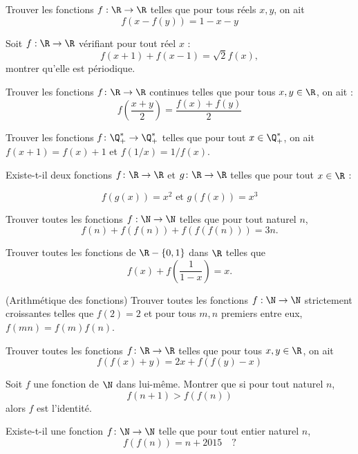 \begin{exo}
Trouver les fonctions $f:\R \rightarrow \R$ telles que pour tous réels $x,y$, on ait
$$f(x-f(y))=1-x-y$$
\end{exo}

\begin{exo}
Soit $f : \R \rightarrow \R$ vérifiant pour tout réel $x$ :
$$f(x+1)+f(x-1)= \sqrt{2}f(x),$$
montrer qu'elle est périodique. 
\end{exo}

\begin{exo}
Trouver les fonctions $f \colon \R \to \R$ continues telles que 
pour tous $x, y \in \R$, on ait :
\[f\left(\frac{x + y}{2}\right) = \frac{f(x) + f(y)}{2}\]
\end{exo}


\begin{exo}Trouver les fonctions $f \colon \Q_+^* \to \Q_+^*$ telles que pour tout $x \in  \Q_+^*$, on ait $f(x + 1) = f(x) + 1$ et $f(1/x) = 1/f(x)$.
\end{exo}



\begin{exo}Existe-t-il deux fonctions $f \colon \R \to \R$ et $g \colon \R \to \R$ telles que pour tout $x \in \R$ :

\[f(g(x)) = x^2 \text{ et } g(f(x)) = x^3\]
\end{exo}

\begin{exo}
Trouver toutes les fonctions $f : \N \rightarrow \N$ telles que pour tout naturel $n$,
$$f(n)+f(f(n))+f(f(f(n)))=3n.$$
\end{exo}

\begin{exo}
Trouver toutes les fonctions de $\R-\lbrace 0,1 \rbrace$ dans $\R$ telles que 
$$f(x)+f\left( \frac{1}{1-x}\right)=x.$$
\end{exo}


\begin{exo}(Arithmétique des fonctions)
Trouver toutes les fonctions $f : \N \rightarrow \N$ strictement croissantes telles que $f(2)=2$ et pour tous $m,n$ premiers entre eux, $f(mn)=f(m)f(n)$. 
\end{exo}


\begin{exo}Trouver toutes les fonctions $f \colon \R \to \R$ telles que pour tous $x, y \in \R$, on ait 
\[f(f(x) + y) = 2x + f(f(y) - x)\]
\end{exo}





\begin{exo}
Soit $f$ une fonction de $\N$ dans lui-même. Montrer que si pour tout naturel $n$, 
$$f(n+1)>f(f(n))$$
alors $f$ est l'identité.
\end{exo}

\begin{exo}
Existe-t-il une fonction $f \colon \N \rightarrow \N$ telle que pour tout entier naturel $n$, 
$$f(f(n))=n+2015 \quad ?$$
\end{exo}
